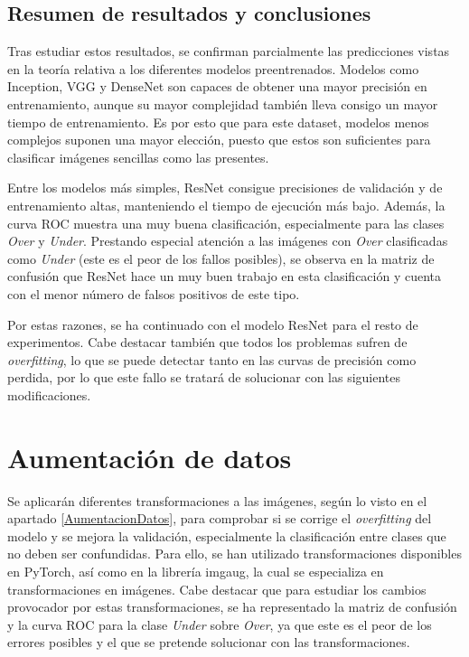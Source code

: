 \documentclass{report}
\begin{document}
\subsection{Resumen de resultados y conclusiones}

Tras estudiar estos resultados, se confirman parcialmente las predicciones vistas en la teoría relativa a los diferentes modelos preentrenados. Modelos como Inception, VGG y DenseNet son capaces de obtener una mayor precisión en entrenamiento, aunque su mayor complejidad también lleva consigo un mayor tiempo de entrenamiento. Es por esto que para este dataset, modelos menos complejos suponen una mayor elección, puesto que estos son suficientes para clasificar imágenes sencillas como las presentes. 

Entre los modelos más simples, ResNet consigue precisiones de validación y de entrenamiento altas, manteniendo el tiempo de ejecución más bajo. Además, la curva ROC muestra una muy buena clasificación, especialmente para las clases \textit{Over} y \textit{Under}. Prestando especial atención a las imágenes con \textit{Over} clasificadas como \textit{Under} (este es el peor de los fallos posibles), se observa en la matriz de confusión que ResNet hace un muy buen trabajo en esta clasificación y cuenta con el menor número de falsos positivos de este tipo. 

Por estas razones, se ha continuado con el modelo ResNet para el resto de experimentos. Cabe destacar también que todos los problemas sufren de \textit{overfitting}, lo que se puede detectar tanto en las curvas de precisión como perdida, por lo que este fallo se tratará de solucionar con las siguientes modificaciones.







\newpage
\section{Aumentación de datos}


Se aplicarán diferentes transformaciones a las imágenes, según lo visto en el apartado \ref{AumentacionDatos}, para comprobar si se corrige el \textit{overfitting} del modelo y se mejora la validación, especialmente la clasificación entre clases que no deben ser confundidas. Para ello, se han utilizado transformaciones disponibles en PyTorch, así como en la librería imgaug, la cual se especializa en transformaciones en imágenes. Cabe destacar que para estudiar los cambios provocador por estas transformaciones, se ha representado la matriz de confusión y la curva ROC para la clase \textit{Under} sobre \textit{Over}, ya que este es el peor de los errores posibles y el que se pretende solucionar con las transformaciones.
\end{document}
